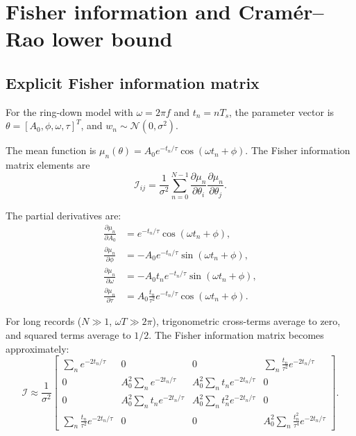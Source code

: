 \documentclass[11pt]{article}
\begin{document}
\section{Fisher information and Cram\'er--Rao lower bound}

\subsection{Explicit Fisher information matrix}

For the ring-down model with $\omega = 2\pi f$ and $t_n = nT_s$, the parameter vector is $\theta = [A_0, \phi, \omega, \tau]^T$, and $w_n \sim \mathcal{N}(0,\sigma^2)$.

The mean function is $\mu_n(\theta) = A_0 e^{-t_n/\tau}\cos(\omega t_n + \phi)$. The Fisher information matrix elements are
\begin{equation}
\mathcal{I}_{ij} = \frac{1}{\sigma^2}\sum_{n=0}^{N-1}
\frac{\partial \mu_n}{\partial \theta_i}\frac{\partial \mu_n}{\partial \theta_j}.
\end{equation}

The partial derivatives are:
\begin{align}
\frac{\partial \mu_n}{\partial A_0} &= e^{-t_n/\tau}\cos(\omega t_n + \phi),\\
\frac{\partial \mu_n}{\partial \phi} &= -A_0 e^{-t_n/\tau}\sin(\omega t_n + \phi),\\
\frac{\partial \mu_n}{\partial \omega} &= -A_0 t_n e^{-t_n/\tau}\sin(\omega t_n + \phi),\\
\frac{\partial \mu_n}{\partial \tau} &= A_0 \frac{t_n}{\tau^2} e^{-t_n/\tau}\cos(\omega t_n + \phi).
\end{align}

For long records ($N \gg 1$, $\omega T \gg 2\pi$), trigonometric cross-terms average to zero, and squared terms average to $1/2$. The Fisher information matrix becomes approximately:
\begin{equation}
\mathcal{I} \approx \frac{1}{\sigma^2}
\begin{bmatrix}
\sum_n e^{-2t_n/\tau} & 0 & 0 & \sum_n \frac{t_n}{\tau^2} e^{-2t_n/\tau}\\
0 & A_0^2 \sum_n e^{-2t_n/\tau} & A_0^2 \sum_n t_n e^{-2t_n/\tau} & 0\\
0 & A_0^2 \sum_n t_n e^{-2t_n/\tau} & A_0^2 \sum_n t_n^2 e^{-2t_n/\tau} & 0\\
\sum_n \frac{t_n}{\tau^2} e^{-2t_n/\tau} & 0 & 0 & A_0^2 \sum_n \frac{t_n^2}{\tau^4} e^{-2t_n/\tau}
\end{bmatrix}.
\label{eq:fisher-matrix}
\end{equation}
\end{document}
